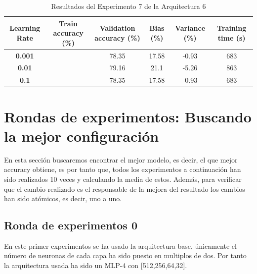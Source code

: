 \documentclass{article}
\begin{document}
   \begin{table}[!h]
				\begin{center}
					\begin{tabular}{ c | c | c | c | c | c |}
						 \textbf{Learning Rate} & \textbf{Train accuracy (\%)} & \textbf{Validation accuracy (\%)} & \textbf{Bias (\%)} & \textbf{Variance (\%)} & \textbf{Training time (s)} \\ \hline
	
                        \textbf{0.001} &    &  78.35& 17.58 & -0.93 &   683  \\ \hline
                        \textbf{0.01} &      & 79.16& 21.1 & -5.26 &   863  \\ \hline
                        \textbf{0.1} &   &  78.35& 17.58 & -0.93 &   683  \\ \hline
					\end{tabular}
					\caption{Resultados del Experimento 7 de la Arquitectura 6}
					\label{tab:res-a2-e5}
				\end{center}
			\end{table}

\newpage

	\section{Rondas de experimentos: Buscando la mejor configuración}

 En esta sección buscaremos encontrar el mejor modelo, es decir, el que mejor accuracy obtiene, es por tanto que, todos los experimentos a continuación han sido realizados 10 veces y calculando la media de estos.
Además, para verificar que el cambio realizado es el responsable de la mejora del resultado los cambios han sido atómicos, es decir, uno a uno.

	\label{j-s-a0} %
		
		
		\subsection{Ronda de experimentos 0}
		\label{j-s-a0-e0} %
			En este primer experimentos se ha usado la arquitectura base, \'unicamente el n\'umero de neuronas de cada capa ha sido puesto en multiplos de dos. 
        Por tanto la arquitectura usada ha sido un MLP-4 con [512,256,64,32].
			
\end{document}

